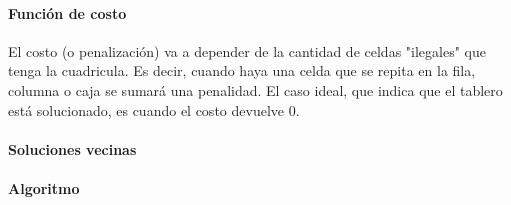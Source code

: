 \paragraph{Función de costo}
El costo (o penalización) va a depender de la cantidad de celdas "ilegales" que tenga la cuadricula. Es decir, cuando haya una celda que se repita en la fila, columna o caja se sumará una penalidad. El caso ideal, que indica que el tablero está solucionado, es cuando el costo devuelve 0.
\paragraph{Soluciones vecinas}
\paragraph{Algoritmo}